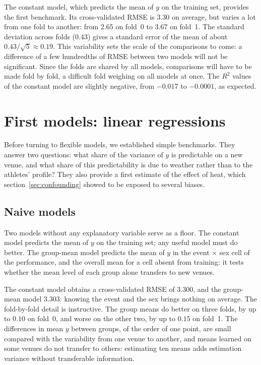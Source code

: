 \documentclass[11pt,a4paper]{article}
\begin{document}
The constant model, which predicts the mean of $y$ on the training set, provides the first benchmark. Its
cross-validated RMSE is 3.30 on average, but varies a lot from one fold to another: from 2.65 on fold~0 to 3.67 on
fold~1. The standard deviation across folds (0.43) gives a standard error of the mean of about
$0.43/\sqrt5 \approx 0.19$. This variability sets the scale of the comparisons to come: a difference of a few
hundredths of RMSE between two models will not be significant. Since the folds are shared by all models, comparisons
will have to be made fold by fold, a difficult fold weighing on all models at once. The $R^2$ values of the constant
model are slightly negative, from $-0.017$ to $-0.0001$, as expected.

\section{First models: linear regressions}\label{sec:linear}

Before turning to flexible models, we established simple benchmarks. They answer two questions: what share of the
variance of $y$ is predictable on a new venue, and what share of this predictability is due to weather rather than to
the athletes' profile? They also provide a first estimate of the effect of heat, which section~\ref{sec:confounding}
showed to be exposed to several biases.

\subsection{Naive models}\label{sec:naive}

Two models without any explanatory variable serve as a floor. The constant model predicts the mean of $y$ on the
training set; any useful model must do better. The group-mean model predicts the mean of $y$ in the event $\times$ sex
cell of the performance, and the overall mean for a cell absent from training: it tests whether the mean level of each
group alone transfers to new venues.

The constant model obtains a cross-validated RMSE of 3.300, and the group-mean model 3.303: knowing the event and the
sex brings nothing on average. The fold-by-fold detail is instructive. The group means do better on three folds, by up
to $0.10$ on fold~0, and worse on the other two, by up to $0.15$ on fold~1. The differences in mean $y$ between groups,
of the order of one point, are small compared with the variability from one venue to another, and means learned on
some venues do not transfer to others: estimating ten means adds estimation variance without transferable
information.
\end{document}
